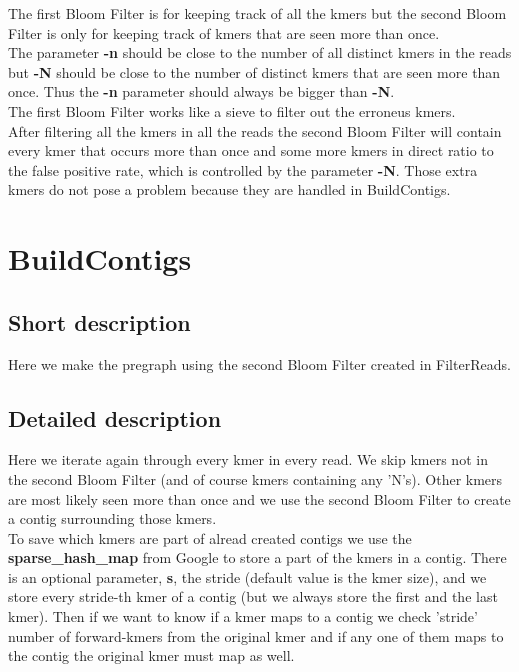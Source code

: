 \documentclass[a4paper]{report}
\renewcommand{\b}[1]{\textbf{#1}}  %
\begin{document}
The first Bloom Filter is for keeping track of all the kmers but the second Bloom Filter
is only for keeping track of kmers that are seen more than once.\\[4pt]

The parameter \b{-n} should be close to the number of all distinct kmers in the reads but \b{-N} should be close to the
number of distinct kmers that are seen more than once. Thus the \b{-n} parameter should always be bigger than \b{-N}.\\[4pt]

The first Bloom Filter works like a sieve to filter out the erroneus kmers.\\[4pt]

After filtering all the kmers in all the reads the second Bloom Filter will contain 
every kmer that occurs more than once and some more kmers in
direct ratio to the false positive rate, which is controlled by the parameter \b{-N}. 
Those extra kmers do not pose a problem because they are handled in BuildContigs.\\[4pt]

\newpage
\section{BuildContigs}

\subsection{Short description}
Here we make the pregraph using the second Bloom Filter created in FilterReads. 

\subsection{Detailed description}
Here we iterate again through every kmer in every read. We skip kmers not in the second Bloom Filter (and of course kmers 
containing any 'N's). 
Other kmers are most likely seen more than once and we use the second Bloom Filter to create a contig surrounding those kmers.\\[4pt]

To save which kmers are part of alread created contigs we use the \b{sparse\_hash\_map} from Google to store a 
part of the kmers in a contig. There is an optional parameter, \b{s}, the stride (default value is the kmer size), 
and we store every stride-th kmer of a contig (but we always store the first and the last kmer). 
Then if we want to know if a kmer maps to a contig we check 'stride' number of forward-kmers from 
the original kmer and if any one of them maps to the contig the original kmer must map as well.\\[4pt]
\end{document}
